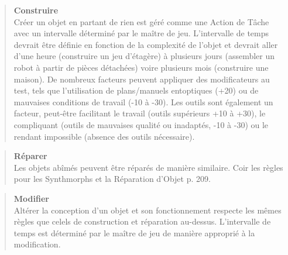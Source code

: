 \begin{quotation} \textbf{Construire} \\ Créer un objet en partant de rien est géré comme une Action de Tâche avec un intervalle déterminé par le maître de jeu. L'intervalle de temps devrait être définie en fonction de la complexité de l'objet et devrait aller d'une heure (construire un jeu d'étagère) à plusieurs jours (assembler un robot à partir de pièces détachées) voire plusieurs mois (construire une maison). De nombreux facteurs peuvent appliquer des modificateurs au test, tels que l'utilisation de plans/manuels entoptiques (+20) ou de mauvaises conditions de travail (-10 à -30). Les outils sont également un facteur, peut-être facilitant le travail (outils supérieurs +10 à +30), le compliquant (outils de mauvaises qualité ou inadaptés, -10 à -30) ou le rendant impossible (absence des outils nécessaire). \end{quotation} 

\begin{quotation} \textbf{Réparer} \\ Les objets abîmés peuvent être réparés de manière similaire. Coir les règles pour les Synthmorphs et la Réparation d'Objet p. 209. \end{quotation} 



\begin{quotation} \textbf{Modifier} \\ Altérer la conception d'un objet et son fonctionnement respecte les mêmes règles que celels de construction et réparation au-dessus. L'intervalle de temps est déterminé par le maître de jeu de manière approprié à la modification. \end{quotation} 









